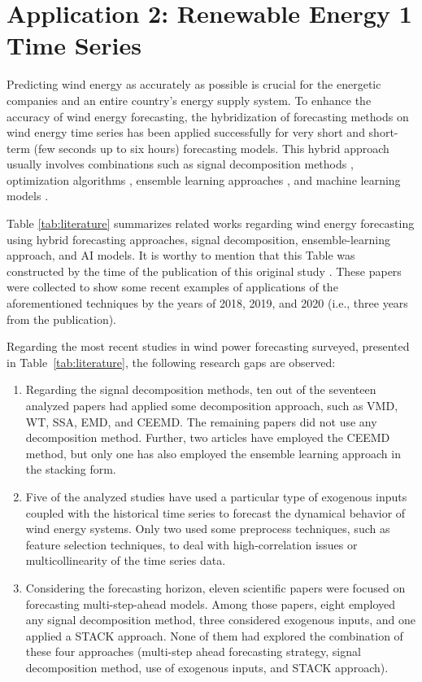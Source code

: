 \section{Application 2: Renewable Energy 1 Time Series}

Predicting wind energy as accurately as possible is crucial for the energetic companies and an entire country's energy supply system. To enhance the accuracy of wind energy forecasting, the hybridization of forecasting methods on wind energy time series has been applied successfully for very short and short-term (few seconds up to six hours) forecasting models. This hybrid approach usually involves combinations such as signal decomposition methods \cite{moreno2018Wind, han2019Wind}, optimization algorithms \cite{li2020Day}, ensemble learning approaches \cite{kim2018Shortterm, ribeiro2019MultiObjective}, and machine learning models \cite{lin2020Wind, niu2020Wind}.

Table \ref{tab:literature} summarizes related works regarding wind energy forecasting using hybrid forecasting approaches, signal decomposition, ensemble-learning approach, and \ac{AI} models. It is worthy to mention that this Table was constructed by the time of the publication of this original study \cite{dasilva2021Novel}. These papers were collected to show some recent examples of applications of the aforementioned techniques  by the years of 2018, 2019, and 2020 (i.e., three years from the publication).



Regarding the most recent studies in wind power forecasting surveyed, presented in Table~\ref{tab:literature}, the following research gaps are observed:

\begin{enumerate}[label = \roman*)]
    \item Regarding the signal decomposition methods, ten out of the seventeen analyzed papers had applied some decomposition approach, such as \ac{VMD}, \ac{WT}, \ac{SSA}, \ac{EMD}, and \ac{CEEMD}. The remaining papers did not use any decomposition method. Further, two articles have employed the \ac{CEEMD} method, but only one has also employed the ensemble learning approach in the stacking form.
    
    \item Five of the analyzed studies have used a particular type of exogenous inputs coupled with the historical time series to forecast the dynamical behavior of wind energy systems. Only two used some preprocess techniques, such as feature selection techniques, to deal with high-correlation issues or multicollinearity of the time series data.
    
    \item Considering the forecasting horizon, eleven scientific papers were focused on forecasting multi-step-ahead models. Among those papers, eight employed any signal decomposition method, three considered exogenous inputs, and one applied a \ac{STACK} approach. None of them had explored the combination of these four approaches (multi-step ahead forecasting strategy, signal decomposition method, use of exogenous inputs, and \ac{STACK} approach).
\end{enumerate}